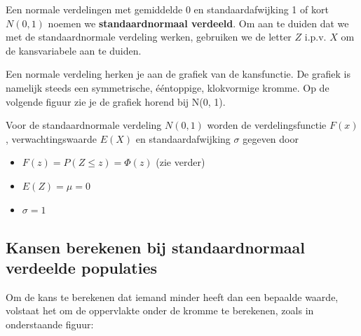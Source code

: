 \documentclass[a4paper,12pt, twoside]{article}
\begin{document}
Een normale verdelingen met gemiddelde 0 en standaardafwijking 1 of kort $N(0,1)$ noemen we {\bf standaardnormaal verdeeld}. Om aan te duiden dat we met de standaardnormale verdeling werken, gebruiken we de letter $Z$ i.p.v. $X$ om de kansvariabele aan te duiden.

Een normale verdeling herken je aan de grafiek van de kansfunctie. De grafiek is namelijk steeds een symmetrische, ééntoppige, klokvormige kromme. Op de volgende figuur zie je de grafiek horend bij N(0, 1).

\begin{center}
\end{center}

Voor de standaardnormale verdeling $N(0,1)$ worden de verdelingsfunctie $F(x)$, verwachtingswaarde $E(X)$ en standaardafwijking $\sigma$ gegeven door
\begin{itemize}
  \item $F(z)=P(Z\leq z)=\Phi(z)$ (zie verder)
  \item $E(Z)=\mu=0$
  \item $\sigma=1$
\end{itemize}

\subsection{Kansen berekenen bij standaardnormaal verdeelde populaties}

Om de kans te berekenen dat iemand minder heeft dan een bepaalde waarde, volstaat het om de oppervlakte onder de kromme te berekenen, zoals in onderstaande figuur:
\end{document}
